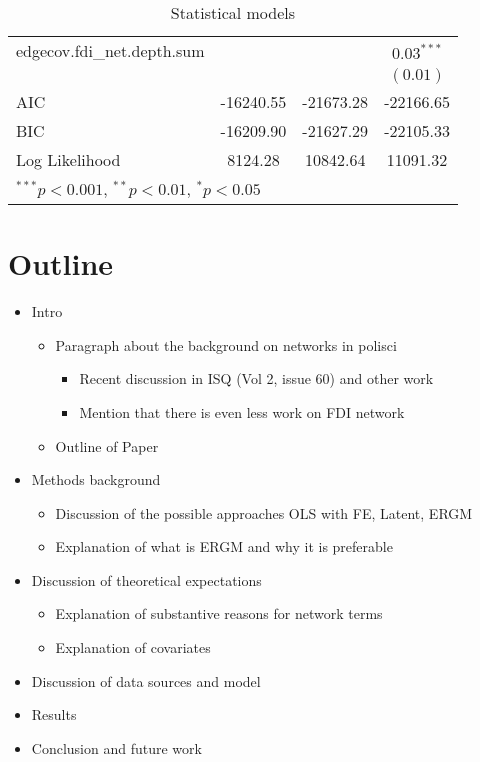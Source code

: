 \documentclass{article}
\begin{document}
\begin{table}[!htb]
\begin{center}
\begin{tabular}{l c c c }
edgecov.fdi\_net.depth.sum      &               &               & $0.03^{***}$  \\
                                &               &               & $(0.01)$      \\
\hline
AIC                             & -16240.55     & -21673.28     & -22166.65     \\
BIC                             & -16209.90     & -21627.29     & -22105.33     \\
Log Likelihood                  & 8124.28       & 10842.64      & 11091.32      \\
\hline
\multicolumn{4}{l}{\scriptsize{$^{***}p<0.001$, $^{**}p<0.01$, $^*p<0.05$}}
\end{tabular}
\caption{Statistical models}
\label{table:coefficients}
\end{center}
\end{table}
\doublespacing

\newpage

\section{Outline}
\begin{itemize}
  \item{Intro}
    \begin{itemize}
      \item{Paragraph about the background on networks in polisci}
     	 \begin{itemize}
      	\item{Recent discussion in ISQ (Vol 2, issue 60) and other work}
      	\item{Mention that there is even less work on FDI network}
      	\end{itemize}
	\item{Outline of Paper}
    \end{itemize}
  \item{Methods background}
   \begin{itemize}
      	\item{Discussion of the possible approaches OLS with FE, Latent, ERGM}
      	\item{Explanation of what is ERGM and why it is preferable}
      	\end{itemize}
  \item{Discussion of theoretical expectations}
  \begin{itemize}
      	\item{Explanation of substantive reasons for network terms}
      	\item{Explanation of covariates}
      	\end{itemize}
   \item{Discussion of data sources and model}
     \item{Results}
     \item{Conclusion and future work}
\end{itemize}
\end{document}
